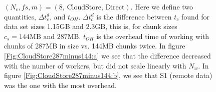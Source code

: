 \documentclass{rspublic}
\begin{document}
\begin{figure}
\begin{center}
\caption{$(N_c, f\!s, m) = (\mbox{8, CloudStore, Direct})$. Here
we define two quantities, $\Delta t_c^d$, and $t_{OH}$. $\Delta t_c^d$
is the difference between $t_c$ found for data set sizes 1.15GB and
2.3GB, this is, for chunk sizes $c_s = 144\mbox{MB and } 287\mbox{MB}$.
$t_{OH}$ is the overhead time of working with chunks of 287MB in size
vs. 144MB chunks twice. In figure \ref{Fig:CloudStore287minus144:a} we
see that the difference decreased with the number of workers, but did
not scale linearly with $N_w$. In figure
\ref{Fig:CloudStore287minus144:b}, we see that S1 (remote data)
was the one with the most overhead.}
\label{Fig:CloudStore287minus144}
\end{center}
\vspace{-0.3cm}
\end{figure}
\end{document}
